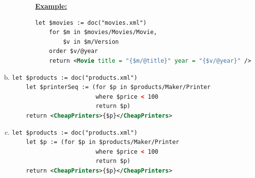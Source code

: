 \documentclass[12pt]{article}
\begin{document}
\begin{enumerate}[1.]
\begin{enumerate}[a)]
\begin{itemize}
\begin{itemize}
                \bigskip

                \underline{\textbf{Example:}}

    \begin{lstlisting}[language=XML]
    let $movies := doc("movies.xml")
    for $m in $movies/Movies/Movie,
        $v in $m/Version
    order $v/@year
    return <Movie title = "{$m/@title}" year = "{$v/@year}" />
    \end{lstlisting}
            \end{itemize}
        \end{itemize}

        \item

    \begin{lstlisting}[language=XML]
    let $products := doc("products.xml")
    let $printerSeq := (for $p in $products/Maker/Printer
                        where $price < 100
                        return $p)
    return <CheapPrinters>{$p}</CheapPrinters>
    \end{lstlisting}

        \item

    \begin{lstlisting}[language=XML]
    let $products := doc("products.xml")
    let $p := (for $p in $products/Maker/Printer
                        where $price < 100
                        return $p)
    return <CheapPrinters>{$p}</CheapPrinters>
    \end{lstlisting}


    \end{enumerate}
\end{enumerate}
\end{document}
